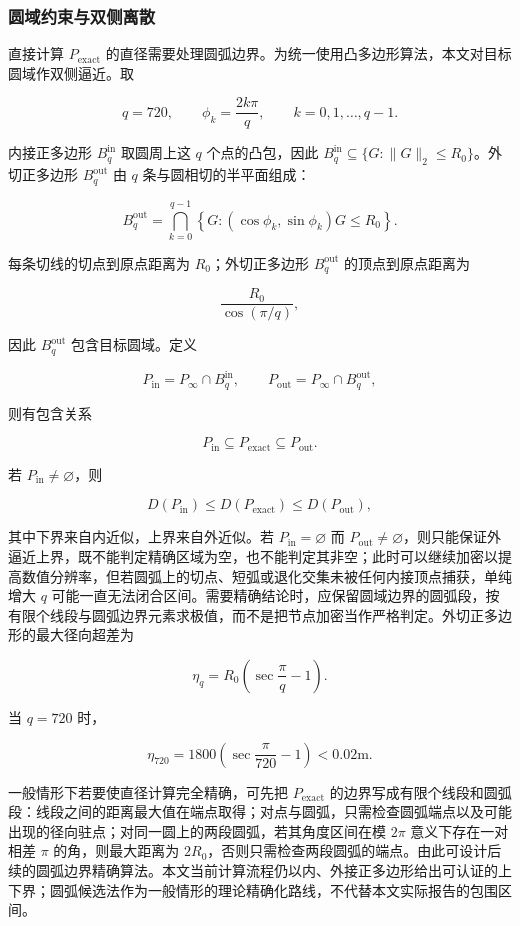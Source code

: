 \subsubsection{圆域约束与双侧离散}

直接计算 $P_{\mathrm{exact}}$ 的直径需要处理圆弧边界。为统一使用凸多边形算法，本文对目标圆域作双侧逼近。取

\[
q=720,\qquad \phi_k=\frac{2k\pi}{q},\qquad k=0,1,\ldots,q-1.
\]

内接正多边形 $B_q^{\mathrm{in}}$ 取圆周上这 $q$ 个点的凸包，因此 $B_q^{\mathrm{in}}\subseteq\{G:\lVert G\rVert_2\le R_0\}$。外切正多边形 $B_q^{\mathrm{out}}$ 由 $q$ 条与圆相切的半平面组成：

\[
B_q^{\mathrm{out}}
=
\bigcap_{k=0}^{q-1}
\left\{
G:
(\cos\phi_k,\sin\phi_k)G\le R_0
\right\}.
\]

每条切线的切点到原点距离为 $R_0$；外切正多边形 $B_q^{\mathrm{out}}$ 的顶点到原点距离为

\[
\frac{R_0}{\cos(\pi/q)},
\]

因此 $B_q^{\mathrm{out}}$ 包含目标圆域。定义

\[
P_{\mathrm{in}}=P_\infty\cap B_q^{\mathrm{in}},
\qquad
P_{\mathrm{out}}=P_\infty\cap B_q^{\mathrm{out}},
\]

则有包含关系

\[
P_{\mathrm{in}}\subseteq P_{\mathrm{exact}}\subseteq P_{\mathrm{out}}.
\]

若 $P_{\mathrm{in}}\ne\varnothing$，则

\[
D(P_{\mathrm{in}})\le D(P_{\mathrm{exact}})\le D(P_{\mathrm{out}}),
\]

其中下界来自内近似，上界来自外近似。若 $P_{\mathrm{in}}=\varnothing$ 而 $P_{\mathrm{out}}\ne\varnothing$，则只能保证外逼近上界，既不能判定精确区域为空，也不能判定其非空；此时可以继续加密以提高数值分辨率，但若圆弧上的切点、短弧或退化交集未被任何内接顶点捕获，单纯增大 $q$ 可能一直无法闭合区间。需要精确结论时，应保留圆域边界的圆弧段，按有限个线段与圆弧边界元素求极值，而不是把节点加密当作严格判定。外切正多边形的最大径向超差为

\[
\eta_q=R_0\left(\sec\frac{\pi}{q}-1\right).
\]

当 $q=720$ 时，

\[
\eta_{720}
=
1800\left(\sec\frac{\pi}{720}-1\right)
<0.02\mathrm{m}.
\]

一般情形下若要使直径计算完全精确，可先把 $P_{\mathrm{exact}}$ 的边界写成有限个线段和圆弧段：线段之间的距离最大值在端点取得；对点与圆弧，只需检查圆弧端点以及可能出现的径向驻点；对同一圆上的两段圆弧，若其角度区间在模 $2\pi$ 意义下存在一对相差 $\pi$ 的角，则最大距离为 $2R_0$，否则只需检查两段圆弧的端点。由此可设计后续的圆弧边界精确算法。本文当前计算流程仍以内、外接正多边形给出可认证的上下界；圆弧候选法作为一般情形的理论精确化路线，不代替本文实际报告的包围区间。

